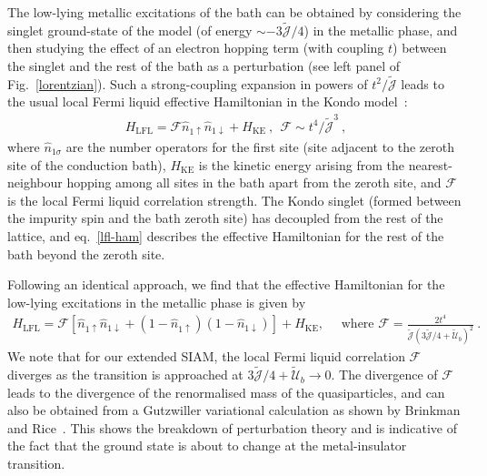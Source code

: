 The low-lying metallic excitations of the bath can be obtained by considering the singlet ground-state of the model (of energy \(\sim -3\mathcal{\tilde J}/4\)) in the metallic phase, and then studying the effect of an electron hopping term (with coupling \(t\)) between the singlet and the rest of the bath as a perturbation (see left panel of Fig.~\eqref{lorentzian}). Such a strong-coupling expansion in powers of \(t^2/\mathcal{\tilde J}\) leads to the usual local Fermi liquid effective Hamiltonian in the Kondo model~\cite{nozieres1974fermi,wilson1975,Noz_blandin_1980,anirban_kondo}:
\begin{eqnarray}
	\label{lfl-ham}
	H_\text{LFL} = \mathcal{F} \hat n_{1 \uparrow} \hat n_{1 \downarrow} + H_\text{KE}~, ~ ~ \mathcal{F} \sim t^4 / \mathcal{\tilde J}^3~,
\end{eqnarray}
where \(\hat n_{1 \sigma}\) are the number operators for the first site (site adjacent to the zeroth site of the conduction bath), \(H_\text{KE}\) is the kinetic energy arising from the nearest-neighbour hopping among all sites in the bath apart from the zeroth site, and \(\mathcal{F}\) is the local Fermi liquid correlation strength. The Kondo singlet (formed between the impurity spin and the bath zeroth site) has decoupled from the rest of the lattice, and eq.~\eqref{lfl-ham} describes the effective Hamiltonian for the rest of the bath beyond the zeroth site. 

Following an identical approach, we find that the effective Hamiltonian for the low-lying excitations in the metallic phase is given by
\begin{eqnarray}
	H_\text{LFL} = \mathcal{F}\left[\hat n_{1 \uparrow} \hat n_{1 \downarrow} + \left(1 - \hat n_{1 \uparrow}\right) \left(1 - \hat n_{1 \downarrow}\right) \right] + H_\text{KE},\quad \text{ where }\mathcal{F} = \frac{2t^4}{\mathcal{\tilde J}\left(3\mathcal{\tilde J}/4 + \mathcal{\tilde U}_b\right)^2}~.
\end{eqnarray}
We note that for our extended SIAM, the local Fermi liquid correlation \(\mathcal{F}\) diverges as the transition is approached at \(3\mathcal{\tilde J}/4 + \mathcal{\tilde U}_b \to 0\). The divergence of \(\mathcal{F}\) leads to the divergence of the renormalised mass of the quasiparticles, and can also be obtained from a Gutzwiller variational calculation as shown by Brinkman and Rice~\cite{brinkman_rice_1970}. This shows the breakdown of perturbation theory and is indicative of the fact that the ground state is about to change at the metal-insulator transition.

